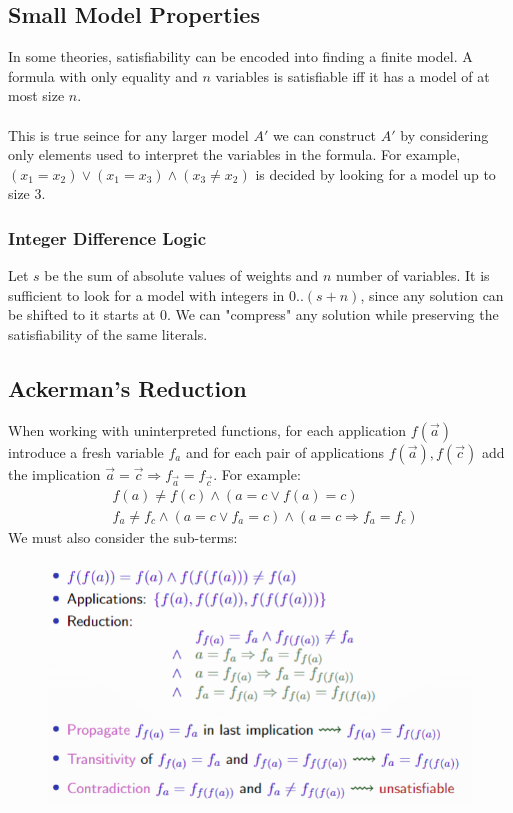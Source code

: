 \documentclass[10pt,a4paper]{report}
\begin{document}
\subsection{Small Model Properties}
In some theories, satisfiability can be encoded into finding a finite model. A formula with only equality and $n$ variables is satisfiable iff it has a model of at most size $n$.\\
\\
This is true seince for any larger model $A'$ we can construct $A'$ by considering only elements used to interpret the variables in the formula. For example, $(x_1 = x_2) \lor (x_1 = x_3) \land (x_3 \neq x_2)$ is decided by looking for a model up to size 3.
\subsubsection{Integer Difference Logic}
Let $s$ be the sum of absolute values of weights and $n$ number of variables. It is sufficient to look for a model with integers in $0..(s+n)$, since any solution can be shifted to it starts at 0. We can "compress" any solution while preserving the satisfiability of the same literals.
\subsection{Ackerman's Reduction}
When working with uninterpreted functions, for each application $f(\vec{a})$ introduce a fresh variable $f_a$ and for each pair of applications $f(\vec{a}), f(\vec{c})$ add the implication $\vec{a} = \vec{c} \Rightarrow f_{\vec{a}} = f_{\vec{c}}$. For example:
\begin{align*}
    &f(a) \neq f(c) \land (a = c \lor f(a) = c)\\
    &f_a \neq f_c \land (a = c \lor f_a = c) \land (a = c \Rightarrow f_a = f_c)
\end{align*}
We must also consider the sub-terms:
\begin{figure}[H]
    \centering
    \includegraphics[scale=0.5]{29.png}
\end{figure}
\end{document}
